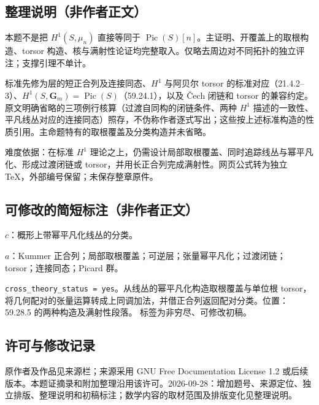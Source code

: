 \documentclass[UTF8,11pt]{ctexart}
\theoremstyle{definition}
\begin{document}
\subsection*{整理说明（非作者正文）}
本题不是把 $H^1(S,\mu_n)$ 直接等同于 $\operatorname{Pic}(S)[n]$。主证明、开覆盖上的取根构造、torsor 构造、核与满射性论证均完整取入。仅略去周边对不同拓扑的独立评注；支撑引理不单计。

标准先修为层的短正合列及连接同态、$H^1$ 与阿贝尔 torsor 的标准对应（21.4.2--3）、$H^1(S,\mathbf G_m)=\operatorname{Pic}(S)$（59.24.1），以及 \v Cech 闭链和 torsor 的兼容约定。原文明确省略的三项例行核算（过渡自同构的闭链条件、两种 $H^1$ 描述的一致性、平凡线丛对应的连接同态）照存，不伪称作者逐式写出；这些按上述标准构造的性质引用。主命题特有的取根覆盖及分类构造并未省略。

难度依据：在标准 $H^1$ 理论之上，仍需设计局部取根覆盖、同时追踪线丛与幂平凡化、形成过渡闭链或 torsor，并用长正合列完成满射性。网页公式转为独立 TeX，外部编号保留；未保存整章原件。
\subsection*{可修改的简短标注（非作者正文）}
$c$：概形上带幂平凡化线丛的分类。

$a$：Kummer 正合列；局部取根覆盖；可逆层；张量幂平凡化；过渡闭链；torsor；连接同态；Picard 群。

\texttt{cross\_theory\_status = yes}。从线丛的幂平凡化构造取根覆盖与单位根 torsor，将几何配对的张量运算转成上同调加法，并借正合列返回配对分类。位置：59.28.5 的两种构造及满射性段落。
标签为非穷尽、可修改初稿。
\subsection*{许可与修改记录}
原作者及作品见来源栏；来源采用 GNU Free Documentation License 1.2 或后续版本。本题证摘录和附加整理沿用该许可。2026-09-28：增加题号、来源定位、独立排版、整理说明和初稿标注；数学内容的取材范围及排版变化见整理说明。
\end{document}
